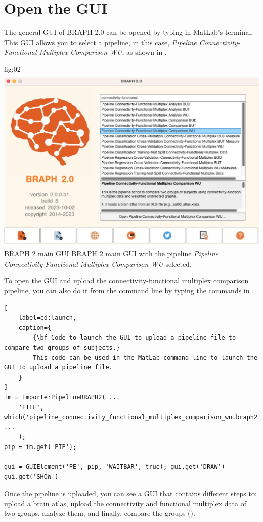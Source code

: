 \documentclass[justified]{tufte-handout}
\begin{document}
\section{Open the GUI}

The general GUI of BRAPH 2.0 can be opened by typing  in MatLab's terminal. This GUI allows you to select a pipeline, in this case, \emph{Pipeline Connectivity-Functional Multiplex Comparison WU}, as shown in .

	{fig:02}
	{
	\includegraphics{fig02.jpg}
	}
	{BRAPH 2 main GUI}
	{
	BRAPH 2 main GUI with the pipeline \emph{Pipeline Connectivity-Functional Multiplex Comparison WU} selected.
	}

\begin{tcolorbox}[
	title=Pipeline launch from command line
]
To open the GUI and upload the connectivity-functional multiplex comparison pipeline, you can also do it from the command line by typing the commands in .
%
\begin{lstlisting}[
	label=cd:launch,
	caption={
		{\bf Code to launch the GUI to upload a pipeline file to compare two groups of subjects.}
		This code can be used in the MatLab command line to launch the GUI to upload a pipeline file.
	}
]
im = ImporterPipelineBRAPH2( ...
	'FILE', which('pipeline_connectivity_functional_multiplex_comparison_wu.braph2') ...
	);
pip = im.get('PIP');

gui = GUIElement('PE', pip, 'WAITBAR', true); gui.get('DRAW')
gui.get('SHOW')
\end{lstlisting}
\end{tcolorbox}

Once the pipeline is uploaded, you can see a GUI that contains different steps to: upload a brain atlas, upload the connectivity and functional multiplex data of two groups, analyze them, and finally, compare the groups (). 
\end{document}
